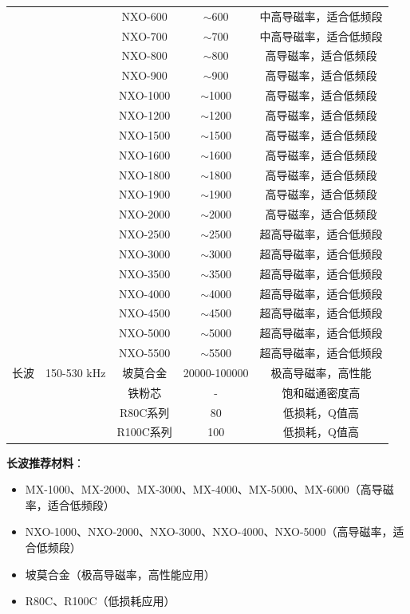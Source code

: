 \begin{center}
\begin{tabular}{|c|c|c|c|c|}
 & & NXO-600 & $\sim$600 & 中高导磁率，适合低频段 \\
 & & NXO-700 & $\sim$700 & 中高导磁率，适合低频段 \\
 & & NXO-800 & $\sim$800 & 高导磁率，适合低频段 \\
 & & NXO-900 & $\sim$900 & 高导磁率，适合低频段 \\
 & & NXO-1000 & $\sim$1000 & 高导磁率，适合低频段 \\
 & & NXO-1200 & $\sim$1200 & 高导磁率，适合低频段 \\
 & & NXO-1500 & $\sim$1500 & 高导磁率，适合低频段 \\
 & & NXO-1600 & $\sim$1600 & 高导磁率，适合低频段 \\
 & & NXO-1800 & $\sim$1800 & 高导磁率，适合低频段 \\
 & & NXO-1900 & $\sim$1900 & 高导磁率，适合低频段 \\
 & & NXO-2000 & $\sim$2000 & 高导磁率，适合低频段 \\
 & & NXO-2500 & $\sim$2500 & 超高导磁率，适合低频段 \\
 & & NXO-3000 & $\sim$3000 & 超高导磁率，适合低频段 \\
 & & NXO-3500 & $\sim$3500 & 超高导磁率，适合低频段 \\
 & & NXO-4000 & $\sim$4000 & 超高导磁率，适合低频段 \\
 & & NXO-4500 & $\sim$4500 & 超高导磁率，适合低频段 \\
 & & NXO-5000 & $\sim$5000 & 超高导磁率，适合低频段 \\
 & & NXO-5500 & $\sim$5500 & 超高导磁率，适合低频段 \\
\hline
长波 & 150-530 kHz & 坡莫合金 & 20000-100000 & 极高导磁率，高性能 \\
 & & 铁粉芯 & - & 饱和磁通密度高 \\
 & & R80C系列 & 80 & 低损耗，Q值高 \\
 & & R100C系列 & 100 & 低损耗，Q值高 \\
\hline
\end{tabular}
\end{center}

\textbf{长波推荐材料}：
\begin{itemize}
    \item MX-1000、MX-2000、MX-3000、MX-4000、MX-5000、MX-6000（高导磁率，适合低频段）
    \item NXO-1000、NXO-2000、NXO-3000、NXO-4000、NXO-5000（高导磁率，适合低频段）
    \item 坡莫合金（极高导磁率，高性能应用）
    \item R80C、R100C（低损耗应用）
\end{itemize}

